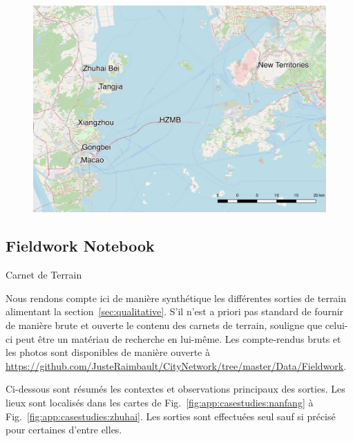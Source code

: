 \begin{figure}
	\includegraphics[width=\linewidth]{Figures/Final/A-casestudies-zhuhai.jpg}	
\end{figure}






\subsection{Fieldwork Notebook}{Carnet de Terrain}

Nous rendons compte ici de manière synthétique les différentes sorties de terrain alimentant la section~\ref{sec:qualitative}. S'il n'est a priori pas standard de fournir de manière brute et ouverte le contenu des carnets de terrain, \cite{goffman1989fieldwork} souligne que celui-ci peut être un matériau de recherche en lui-même. Les compte-rendus bruts et les photos sont disponibles de manière ouverte à \url{https://github.com/JusteRaimbault/CityNetwork/tree/master/Data/Fieldwork}.


Ci-dessous sont résumés les contextes et observations principaux des sorties. Les lieux sont localisés dans les cartes de Fig.~\ref{fig:app:casestudies:nanfang} à Fig.~\ref{fig:app:casestudies:zhuhai}. Les sorties sont effectuées seul sauf si précisé pour certaines d'entre elles.

